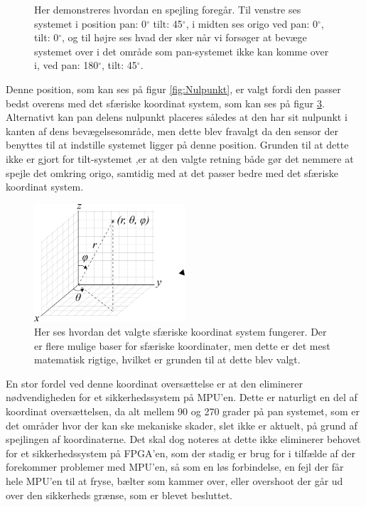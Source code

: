 \begin{figure}[!h]
\begin{subfigure}[b]{0.3\textwidth}
        \caption{}
        \label{fig:tilt_spejl}
    \end{subfigure}
   \caption{Her demonstreres hvordan en spejling foregår. Til venstre ses systemet i position pan: 0$^{\circ}$ tilt: 45$^{\circ}$, i midten ses origo ved pan: 0$^{\circ}$, tilt: 0$^{\circ}$, og til højre ses hvad der sker når vi forsøger at bevæge systemet over i det område som pan-systemet ikke kan komme over i, ved pan: 180$^{\circ}$, tilt: 45$^{\circ}$.}
\end{figure}

Denne position, som kan ses på figur \ref{fig:Nulpunkt}, er valgt fordi den passer bedst overens med det sfæriske koordinat system, som kan ses på figur \ref{fig:Spherical}. Alternativt kan pan delens nulpunkt placeres således at den har sit nulpunkt i kanten af dens bevægelsesområde, men dette blev fravalgt da den sensor der benyttes til at indstille systemet ligger på denne position. Grunden til at dette ikke er gjort for tilt-systemet ,er at den valgte retning både gør det nemmere at spejle det omkring origo, samtidig med at det passer bedre med det sfæriske koordinat system.

\begin{figure}[!hb]
	\begin{center}
		\includegraphics[width=0.5\textwidth]{Billeder/Spherical.png}
	\end{center}		
	\caption{Her ses hvordan det valgte sfæriske koordinat system fungerer. Der er flere mulige baser for sfæriske koordinater, men dette er det mest matematisk rigtige, hvilket er grunden til at dette blev valgt.}
	\label{fig:Spherical}
\end{figure}
En stor fordel ved denne koordinat oversættelse er at den eliminerer nødvendigheden for et sikkerhedssystem på MPU'en. Dette er naturligt en del af koordinat oversættelsen, da alt mellem 90 og 270 grader på pan systemet, som er det områder hvor der kan ske mekaniske skader, slet ikke er aktuelt, på grund af spejlingen af koordinaterne. Det skal dog noteres at dette ikke eliminerer behovet for et sikkerhedssystem på FPGA'en, som der stadig er brug for i tilfælde af der forekommer problemer med MPU'en, så som en løs forbindelse, en fejl der får hele MPU'en til at fryse, bælter som kammer over, eller overshoot der går ud over den sikkerheds grænse, som er blevet besluttet.




















